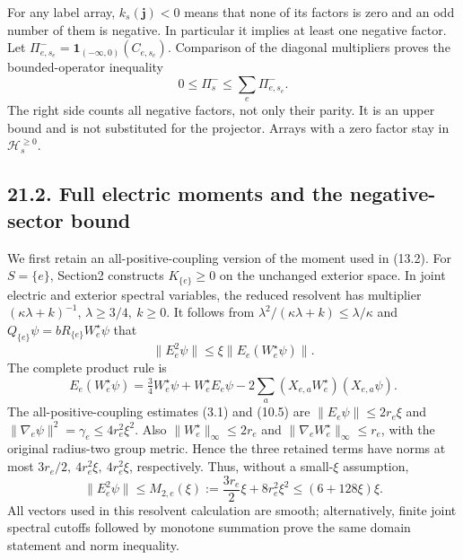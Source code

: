 \documentclass[
]{article}
\begin{document}
For any label array, \(k_s(\boldsymbol j)<0\) means that none of its
factors is zero and an odd number of them is negative. In particular it
implies at least one negative factor. Let
\(\Pi_{e,s_e}^-=\mathbf1_{(-\infty,0)}(C_{e,s_e})\). Comparison of the
diagonal multipliers proves the bounded-operator inequality \[
0\le\Pi_s^-\le\sum_e\Pi_{e,s_e}^- .                            \tag{21.3}
\] The right side counts all negative factors, not only their parity. It
is an upper bound and is not substituted for the projector. Arrays with
a zero factor stay in \(\mathscr H_s^{\ge0}\).

\subsection{21.2. Full electric moments and the negative-sector
bound}\label{full-electric-moments-and-the-negative-sector-bound}

We first retain an all-positive-coupling version of the moment used in
(13.2). For \(S=\{e\}\), Section2 constructs \(K_{\{e\}}\ge0\) on the
unchanged exterior space. In joint electric and exterior spectral
variables, the reduced resolvent has multiplier
\((\kappa\lambda+k)^{-1}\), \(\lambda\ge3/4,\ k\ge0\). It follows from
\(\lambda^2/(\kappa\lambda+k)\le\lambda/\kappa\) and
\(Q_{\{e\}}\psi=bR_{\{e\}}W_e^\star\psi\) that \[
\|E_e^2\psi\|\le\xi\|E_e(W_e^\star\psi)\|.
\] The complete product rule is \[
E_e(W_e^\star\psi)
 =\tfrac34W_e^\star\psi+W_e^\star E_e\psi
       -2\sum_a(X_{e,a}W_e^\star)(X_{e,a}\psi).
\] The all-positive-coupling estimates (3.1) and (10.5) are
\(\|E_e\psi\|\le2r_e\xi\) and
\(\|\nabla_e\psi\|^2=\gamma_e\le4r_e^2\xi^2\). Also
\(\|W_e^\star\|_\infty\le2r_e\) and
\(\|\nabla_eW_e^\star\|_\infty\le r_e\), with the original radius-two
group metric. Hence the three retained terms have norms at most
\(3r_e/2,\ 4r_e^2\xi,\ 4r_e^2\xi\), respectively. Thus, without a
small-\(\xi\) assumption, \[
\|E_e^2\psi\|\le
M_{2,e}(\xi):=\frac{3r_e}{2}\xi+8r_e^2\xi^2
\le(6+128\xi)\xi .                                           \tag{21.4}
\] All vectors used in this resolvent calculation are smooth;
alternatively, finite joint spectral cutoffs followed by monotone
summation prove the same domain statement and norm inequality.
\end{document}
